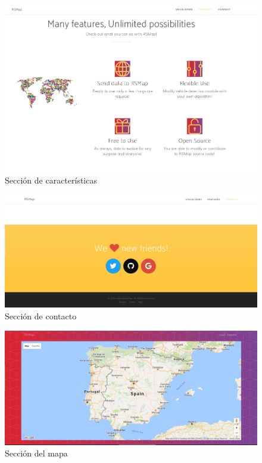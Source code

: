\begin{figure}[!ht]
  \begin{center}
    \includegraphics[scale=0.45]{../images/web/main3.png}
		\caption{Sección de características}
    \label{fig:kaa}
	\end{center}
\end{figure}

\begin{figure}[!ht]
  \begin{center}
    \includegraphics[scale=0.3]{../images/web/main4.png}
		\caption{Sección de contacto}
    \label{fig:kaa}
	\end{center}
\end{figure}

\begin{figure}[!ht]
  \begin{center}
    \includegraphics[scale=0.3]{../images/web/map.png}
		\caption{Sección del mapa}
    \label{fig:kaa}
	\end{center}
\end{figure}

